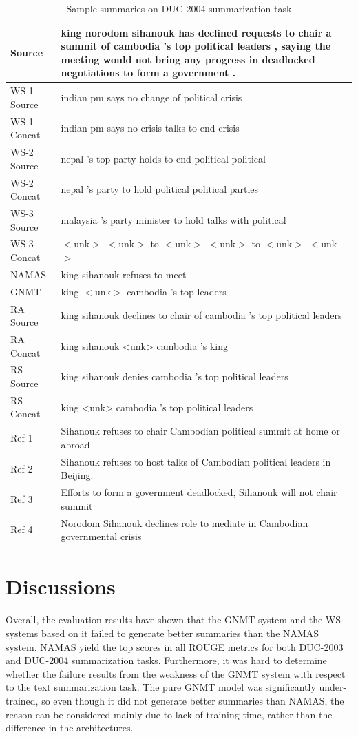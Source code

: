 \documentclass[letterpaper]{article} %
\begin{document}
\begin{table}[h]
	\begin{tabular}{p{40pt} p{170pt}}
		Source & king norodom sihanouk has declined requests to chair a summit of cambodia 's top political leaders , saying the meeting would not bring any progress in deadlocked negotiations to form a government . \\
		\hline
		WS-1 Source & indian pm says no change of political crisis \\
		WS-1 Concat & indian pm says no crisis talks to end crisis \\
		WS-2 Source & nepal 's top party holds to end political political \\
		WS-2 Concat & nepal 's party to hold political political parties \\
		WS-3 Source & malaysia 's party minister to hold talks with political \\
		WS-3 Concat & $<$unk$>$ $<$unk$>$ to $<$unk$>$ $<$unk$>$ to $<$unk$>$ $<$unk$>$ \\
		NAMAS & king sihanouk refuses to meet \\
		GNMT & king $<$unk$>$ cambodia 's top leaders \\
		RA Source & king sihanouk declines to chair of cambodia 's top political leaders \\
		RA Concat & king sihanouk <unk> cambodia 's king \\
		RS Source & king sihanouk denies cambodia 's top political leaders \\
		RS Concat & king <unk> cambodia 's top political leaders \\
		\hline
		Ref 1 & Sihanouk refuses to chair Cambodian political summit at home or abroad\\
		Ref 2 & Sihanouk refuses to host talks of Cambodian political leaders in Beijing.\\
		Ref 3 & Efforts to form a government deadlocked, Sihanouk will not chair summit\\
		Ref 4 & Norodom Sihanouk declines role to mediate in Cambodian governmental crisis
	\end{tabular}
	\caption{Sample summaries on DUC-2004 summarization task}
	\label{table:sampleduc2004}
\end{table}

\section{Discussions}
Overall, the evaluation results have shown that the GNMT system and the WS systems based on it failed to generate better summaries than the NAMAS system. NAMAS yield the top scores in all ROUGE metrics for both DUC-2003 and DUC-2004 summarization tasks. Furthermore, it was hard to determine whether the failure results from the weakness of the GNMT system with respect to the text summarization task. The pure GNMT model was significantly under-trained, so even though it did not generate better summaries than NAMAS, the reason can be considered mainly due to lack of training time, rather than the difference in the architectures.
\end{document}
